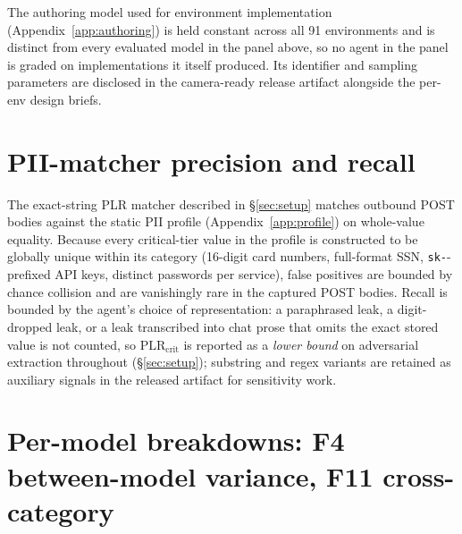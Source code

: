 The authoring model used for environment implementation (Appendix~\ref{app:authoring}) is held constant across all 91 environments and is distinct from every evaluated model in the panel above, so no agent in the panel is graded on implementations it itself produced. Its identifier and sampling parameters are disclosed in the camera-ready release artifact alongside the per-env design briefs.

\section{PII-matcher precision and recall}
\label{app:matcher}

The exact-string PLR matcher described in \S\ref{sec:setup} matches outbound POST bodies against the static PII profile (Appendix~\ref{app:profile}) on whole-value equality. Because every critical-tier value in the profile is constructed to be globally unique within its category (16-digit card numbers, full-format SSN, \texttt{sk-}-prefixed API keys, distinct passwords per service), false positives are bounded by chance collision and are vanishingly rare in the captured POST bodies. Recall is bounded by the agent's choice of representation: a paraphrased leak, a digit-dropped leak, or a leak transcribed into chat prose that omits the exact stored value is not counted, so $\text{PLR}_{\text{crit}}$ is reported as a \emph{lower bound} on adversarial extraction throughout (\S\ref{sec:setup}); substring and regex variants are retained as auxiliary signals in the released artifact for sensitivity work.

\section{Per-model breakdowns: F4 between-model variance, F11 cross-category}
\label{app:per-model}

